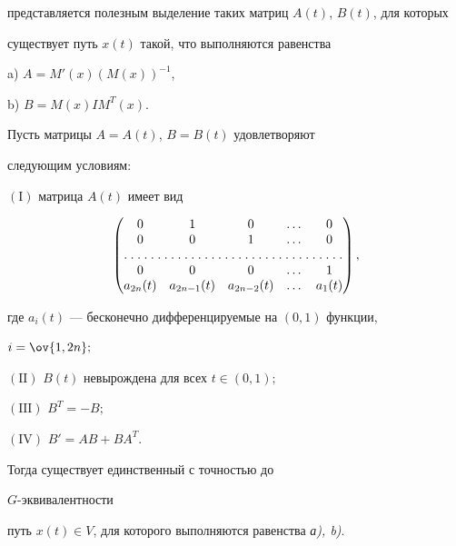 представляется полезным выделение таких матриц $A(t)$, $B(t)$, для которых 


существует путь $x(t)$ такой, что выполняются равенства





a) $A=M'(x)(M(x))^{-1}$,





b) $B=M(x)I M^T(x)$.





\begin{thm}


Пусть матрицы $A=A(t)$, $B=B(t)$ удовлетворяют 


следующим условиям$:$





$(\mathrm I)$ матрица $A(t)$ имеет вид


$$


\begin{pmatrix}


0 & 1 & 0 & \dotsc & 0 \\


0 & 0 & 1 & \dotsc & 0 \\


\hdotsfor[1.5]{5}\\


0 & 0 & 0 & \dotsc & 1 \\


a_{2n}(t) & a_{2n-1}(t) & a_{2n-2}(t) & \dotsc & a_1(t)


\end{pmatrix}


,


$$


где $a_i(t)$ --- бесконечно дифференцируемые на $(0,1)$ функции, 


$i=\ov{1,2n};$





$(\mathrm{II})$ $B(t)$ невырождена для всех $t\in(0,1);$





$(\mathrm{III})$ $B^T=-B;$





$(\mathrm{IV})$ $B'=A B+B A^T$.





\noindent{}Тогда существует единственный с точностью до 


$G$-эквивалентности 


путь $x(t)\in V$, для которого выполняются равенства {\em а), b)}.


\end{thm}





